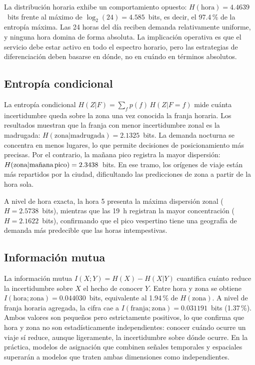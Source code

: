 \documentclass[12pt, a4paper]{article}
\begin{document}
La distribución horaria exhibe un comportamiento opuesto: $H(\text{hora}) = 4{.}4639$~bits frente al máximo de $\log_2(24) = 4{.}585$~bits, es decir, el 97{.}4\,\% de la entropía máxima. Las 24 horas del día reciben demanda relativamente uniforme, y ninguna hora domina de forma absoluta. La implicación operativa es que el servicio debe estar activo en todo el espectro horario, pero las estrategias de diferenciación deben basarse en dónde, no en cuándo en términos absolutos.

\subsection{Entropía condicional}

La entropía condicional $H(Z|F) = \sum_f p(f)\,H(Z|F{=}f)$ mide cuánta incertidumbre queda sobre la zona una vez conocida la franja horaria. Los resultados muestran que la franja con menor incertidumbre zonal es la madrugada: $H(\text{zona}|\text{madrugada}) = 2{.}1325$~bits. La demanda nocturna se concentra en menos lugares, lo que permite decisiones de posicionamiento más precisas. Por el contrario, la mañana pico registra la mayor dispersión: $H(\text{zona}|\text{mañana\,pico}) = 2{.}3438$~bits. En ese tramo, los orígenes de viaje están más repartidos por la ciudad, dificultando las predicciones de zona a partir de la hora sola.

A nivel de hora exacta, la hora 5 presenta la máxima dispersión zonal ($H = 2{.}5738$~bits), mientras que las 19~h registran la mayor concentración ($H = 2{.}1622$~bits), confirmando que el pico vespertino tiene una geografía de demanda más predecible que las horas intempestivas.

\subsection{Información mutua}

La información mutua $I(X;Y) = H(X) - H(X|Y)$ cuantifica cuánto reduce la incertidumbre sobre $X$ el hecho de conocer $Y$. Entre hora y zona se obtiene $I(\text{hora};\text{zona}) = 0{.}044030$~bits, equivalente al 1{.}94\,\% de $H(\text{zona})$. A nivel de franja horaria agregada, la cifra cae a $I(\text{franja};\text{zona}) = 0{.}031191$~bits (1{.}37\,\%). Ambos valores son pequeños pero estrictamente positivos, lo que confirma que hora y zona no son estadísticamente independientes: conocer cuándo ocurre un viaje sí reduce, aunque ligeramente, la incertidumbre sobre dónde ocurre. En la práctica, modelos de asignación que combinen señales temporales y espaciales superarán a modelos que traten ambas dimensiones como independientes.
\end{document}
